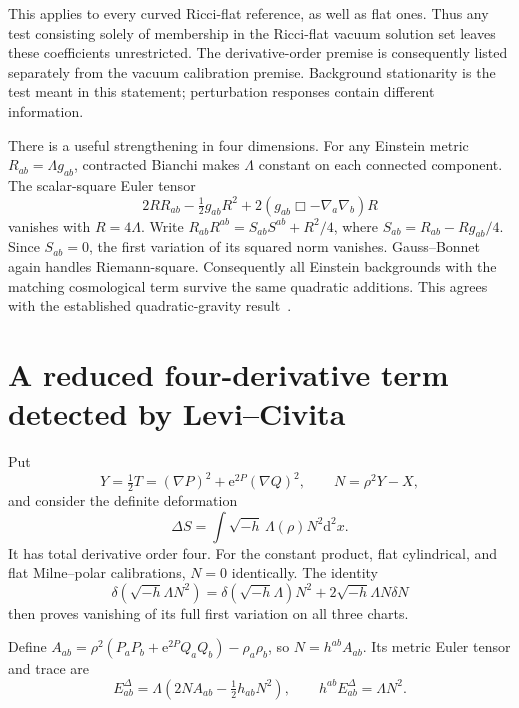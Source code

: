 \documentclass[11pt]{article}
\newcommand{\dd}{\mathrm d}
\newcommand{\vol}{\sqrt{-h}}
\newcommand{\e}{\mathrm e}
\begin{document}
This applies to every curved Ricci-flat reference, as well as flat ones. Thus any test consisting solely of membership in the Ricci-flat vacuum solution set leaves these coefficients unrestricted. The derivative-order premise is consequently listed separately from the vacuum calibration premise. Background stationarity is the test meant in this statement; perturbation responses contain different information.

There is a useful strengthening in four dimensions. For any Einstein metric $R_{ab}=\Lambda g_{ab}$, contracted Bianchi makes $\Lambda$ constant on each connected component. The scalar-square Euler tensor
\begin{equation}
 2RR_{ab}-\tfrac12g_{ab}R^2+2(g_{ab}\Box-\nabla_a\nabla_b)R
\end{equation}
vanishes with $R=4\Lambda$. Write $R_{ab}R^{ab}=S_{ab}S^{ab}+R^2/4$, where $S_{ab}=R_{ab}-Rg_{ab}/4$. Since $S_{ab}=0$, the first variation of its squared norm vanishes. Gauss--Bonnet again handles Riemann-square. Consequently all Einstein backgrounds with the matching cosmological term survive the same quadratic additions. This agrees with the established quadratic-gravity result~\cite{Pravda}.

\section{A reduced four-derivative term detected by Levi--Civita}

Put
\begin{equation}
 Y=\tfrac12T=(\nabla P)^2+\e^{2P}(\nabla Q)^2,\qquad
 N=\rho^2Y-X,
\end{equation}
and consider the definite deformation
\begin{equation}\label{eq:deform}
 \Delta S=\int\vol\,\Lambda(\rho)N^2\dd^2x.
\end{equation}
It has total derivative order four. For the constant product, flat cylindrical, and flat Milne--polar calibrations, $N=0$ identically. The identity
\begin{equation}
 \delta(\vol\Lambda N^2)=\delta(\vol\Lambda)N^2+2\vol\Lambda N\delta N
\end{equation}
then proves vanishing of its full first variation on all three charts.

Define $A_{ab}=\rho^2(P_aP_b+\e^{2P}Q_aQ_b)-\rho_a\rho_b$, so $N=h^{ab}A_{ab}$. Its metric Euler tensor and trace are
\begin{equation}\label{eq:Ntrace}
 E^{\Delta}_{ab}=\Lambda(2NA_{ab}-\tfrac12h_{ab}N^2),\qquad
 h^{ab}E^{\Delta}_{ab}=\Lambda N^2.
\end{equation}
\end{document}
